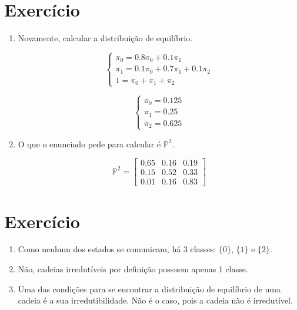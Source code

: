 \documentclass{article}
\begin{document}
\section{Exercício}

\begin{enumerate}[label=(\alph*)]
    \item Novamente, calcular a distribuição de equilíbrio.
    
    $$\begin{cases}
      \pi_0 = 0.8\pi_0+0.1\pi_1\\
      \pi_1 = 0.1\pi_0+0.7\pi_1+0.1\pi_2\\
      1 = \pi_0 + \pi_1 + \pi_2
    \end{cases}$$
    
    $$\begin{cases}
      \pi_0 = 0.125\\
      \pi_1 = 0.25\\
      \pi_2 = 0.625
    \end{cases}$$
    
    \newpage
    
    \item O que o enunciado pede para calcular é $\mathbb{P}^2$.
    
    $$\mathbb{P}^2=\begin{bmatrix}
        0.65 & 0.16 & 0.19\\
        0.15 & 0.52 & 0.33\\
        0.01 & 0.16 & 0.83
    \end{bmatrix}$$

\end{enumerate}

\section{Exercício}

\begin{enumerate}[label=(\alph*)]
    \item Como nenhum dos estados se comunicam, há 3 classes: $\{0\}$, $\{1\}$ e $\{2\}$.
    \item Não, cadeias irredutíveis por definição possuem apenas 1 classe.
    \item Uma das condições para se encontrar a distribuição de equilíbrio de uma cadeia é a sua irredutibilidade. Não é o caso, pois a cadeia não é irredutível.

\end{enumerate}
\end{document}
